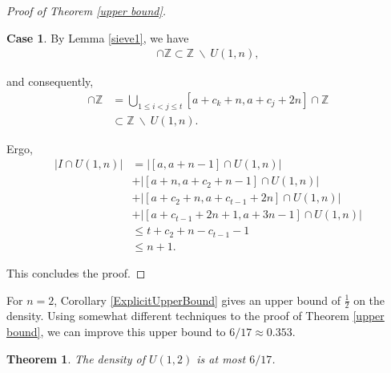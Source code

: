 \documentclass{amsart}
\newcommand{\ZZ}{\mathbb{Z}}
\theoremstyle{theorem}
\newtheorem{theorem}{Theorem}[section]
\theoremstyle{definition}
\newtheorem{case}{Case}
\begin{document}
\begin{proof}[Proof of Theorem \ref{upper bound}]
\begin{case}
\noindent By Lemma \ref{sieve1}, we have
	\begin{align*}
    [a + c_k + n, a + c_j + 2n] \cap \ZZ \subset \ZZ \ \backslash \ U(1,n),
    \end{align*}
    
\noindent and consequently,
	\begin{align*}
    [a + c_2 + n, a + c_{t - 1} + 2n] \cap \ZZ &= \bigcup_{1 \leq i < j \leq t}[a + c_k + n, a + c_j + 2n] \cap \ZZ \\
    &\subset \ZZ \ \backslash \ U(1,n).
    \end{align*}
    
\noindent Ergo,
	\begin{align*}
    \left|I \cap U(1,n)\right| &= \left|[a,a + n - 1] \cap U(1,n)\right| \\
    &+ \left|[a + n, a + c_2 + n - 1]\cap U(1,n)\right| \\
    &+ \left|[a + c_2 + n, a + c_{t - 1} + 2n]\cap U(1,n)\right| \\
    &+ \left|[a + c_{t - 1} + 2n + 1, a + 3n - 1]\cap U(1,n)\right| \\
    &\leq t + c_2 + n - c_{t - 1} - 1 \\
    &\leq n + 1.
    \end{align*}
\end{case}

\noindent This concludes the proof.
\end{proof}

For $n = 2$, Corollary \ref{ExplicitUpperBound} gives an upper bound of $\frac{1}{2}$ on the density. Using somewhat different techniques to the proof of Theorem \ref{upper bound}, we can improve this upper bound to $6/17\approx 0.353$.

\begin{theorem}
The density of $U(1,2)$ is at most $6/17$.
\end{theorem}
\end{document}

